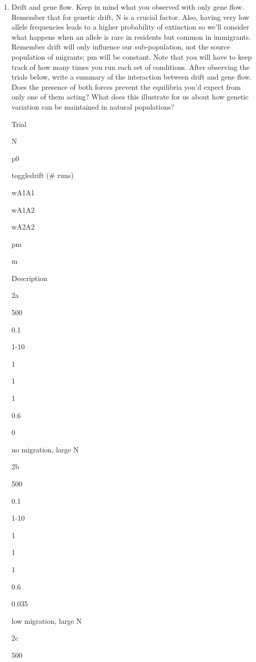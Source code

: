 \begin{enumerate}
\begin{itemize}
    0.035

    m = 0.035, lower m
  \end{itemize}
\item
  Drift and gene flow. Keep in mind what you observed with only gene
  flow. Remember that for genetic drift, N is a crucial factor. Also,
  having very low allele frequencies leads to a higher probability of
  extinction so we'll consider what happens when an allele is rare in
  residents but common in immigrants. Remember drift will only influence
  our sub-population, not the source population of migrants; pm will be
  constant. Note that you will have to keep track of how many times you
  run each set of conditions. After observing the trials below, write a
  summary of the interaction between drift and gene flow. Does the
  presence of both forces prevent the equilibria you'd expect from only
  one of them acting? What does this illustrate for us about how genetic
  variation can be maintained in natural populations?

  Trial

  N

  p0

  toggledrift (\# runs)

  wA1A1

  wA1A2

  wA2A2

  pm

  m

  Description

  2a

  500

  0.1

  1-10

  1

  1

  1

  0.6

  0

  no migration, large N

  2b

  500

  0.1

  1-10

  1

  1

  1

  0.6

  0.035

  low migration, large N

  2c

  500


\end{enumerate}
